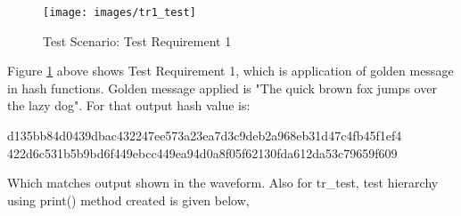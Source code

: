 \begin{figure}[ht]
	\centering
	\texttt{[image: images/tr1\_test]}
	\caption{Test Scenario: Test Requirement 1 \label{tr1test}}
\end{figure}

Figure \ref{tr1test} above shows Test Requirement 1, which is application of golden message in hash functions. Golden message applied is "The quick brown fox jumps over the lazy dog". For that output hash value is:

\begin{tcolorbox}

	\begin{verbbox}
	
d135bb84d0439dbac432247ee573a23ea7d3c9deb2a968eb31d47c4fb45f1ef4
422d6c531b5b9bd6f449ebcc449ea94d0a8f05f62130fda612da53c79659f609
	\end{verbbox}
	\resizebox{0.95\textwidth}{!}{\theverbbox}
	
\end{tcolorbox}

Which matches output shown in the waveform. Also for tr\_test, test hierarchy using print() method created is given below,


